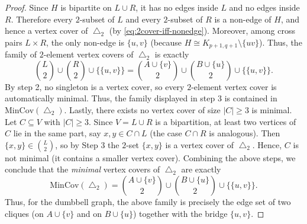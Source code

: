 \documentclass[10pt,a4paper]{amsart}
\newcommand{\MIN}{\mathrm{MinCov}}
\begin{document}
\begin{proof}
			Since \(H\) is bipartite on \(L\cup R\), it has  no edges inside \(L\) and no edges inside \(R\).
			Therefore every \(2\)-subset of \(L\) and every \(2\)-subset of \(R\) is a non-edge of \(H\),
			and hence  a vertex cover of \(\bigtriangleup_2\) (by \eqref{eq:2cover-iff-nonedge}).
			Moreover, among cross pairs \(L\times R\), the only non-edge is \(\{u,v\}\) (because \(H\cong K_{p+1,q+1}\setminus\{uv\}\)).
			Thus, the family of \(2\)-element vertex covers of \(\bigtriangleup_2\) is exactly
			\[
			\binom{L}{2} \cup \binom{R}{2} \cup \{\{u,v\}\}
			=
			\binom{A\cup\{v\}}{2} \cup \binom{B\cup\{u\}}{2} \cup \{\{u,v\}\}.
			\]
			By step 2, no singleton is a vertex cover, so every \(2\)-element vertex cover is automatically minimal.
			Thus, the family displayed in step 3 is contained in \(\MIN(\bigtriangleup_2)\). Lastly, there exists no vertex cover of size \(|C|\ge 3\) is minimal. 
			Let \(C\subseteq V\) with \(|C|\ge 3\). Since \(V=L\cup R\) is a bipartition, at least two vertices of \(C\) lie in the same part,
			say \(x,y\in C\cap L\) (the case \(C\cap R\) is analogous). Then \(\{x,y\}\in \binom{L}{2}\), so by Step 3
			the \(2\)-set \(\{x,y\}\) is a vertex cover of \(\bigtriangleup_2\).
			Hence, \(C\) is not minimal (it contains a smaller vertex cover). Combining the above steps, we conclude that the \emph{minimal} vertex covers of \(\bigtriangleup_2\) are exactly
			\[
			\MIN(\bigtriangleup_2)=\binom{A\cup\{v\}}{2} \cup \binom{B\cup\{u\}}{2} \cup \{\{u,v\}\}.
			\]
			Thus, for the dumbbell graph, the above family is precisely the edge set of two cliques
			(on \(A\cup\{v\}\) and on \(B\cup\{u\}\)) together with the bridge \(\{u,v\}\).
		\end{proof}
\end{document}
